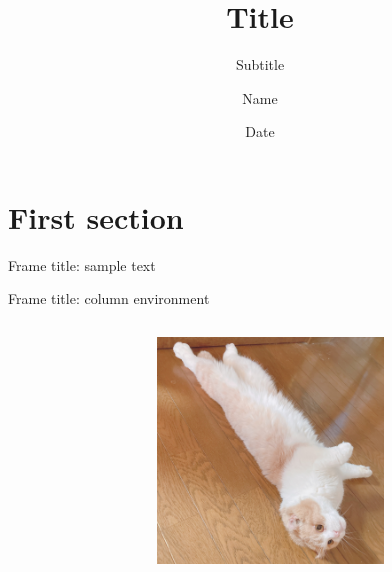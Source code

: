 \documentclass[unicode,11pt,aspectratio=169]{beamer}
\title{Title}
\subtitle{Subtitle}
\author{Name}
\institute{Institue}
\date{Date}
\begin{document}
\maketitle
\section{First section}
\begin{frame}{Frame title: sample text}
  
  \stc{
    \lipsum[1][1-3]
  }

  \stc{
    \lipsum[1][4-7] \\
    \lipsum[1][8-10]
  }

\end{frame}
\begin{frame}{Frame title: column environment}
  \begin{columns}[c]

    \begin{column}{0.48\linewidth}

      \stc{
        \red{\lipsum[1][11-13]}
      }
      \stc{
        \lipsum[1][14-17]
      }

      \begin{center}
        \blue{{\Large \lipsum[1][18]\\ \lipsum[1][19]}}
      \end{center}

    \end{column}

    \begin{column}{0.48\linewidth}
      \begin{figure}[htbp]
        \centering
        \includegraphics[height=6cm]{images/maron.png}
      \end{figure}
    \end{column}

  \end{columns}  
\end{frame}
\end{document}
